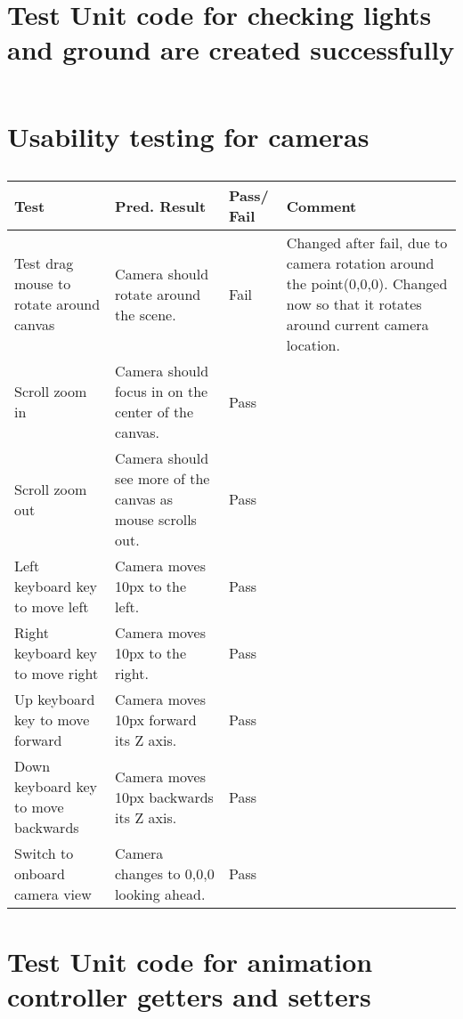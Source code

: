 \section{Test Unit code for checking lights and ground are created successfully}
\label{test:lights}
\begin{figure}[h!]
\caption{}
\begin{lstlisting}
\end{lstlisting}
\end{figure}

\section{Usability testing for cameras}
\begin{table}[h]
\begin{tabular}{|p{4.5cm}|p{4.5cm}|p{1cm}|p{4cm}|}
\hline
\textbf{Test} & \textbf{Pred. Result} & \textbf{Pass/ Fail} & \textbf{Comment}                        \\ \hline
Test drag mouse to rotate around canvas    &  Camera should rotate around the scene.  &     Fail       &  Changed after fail, due to camera rotation around the point(0,0,0). Changed now so that it rotates around current camera location.    \\ \hline
Scroll zoom in    &   Camera should focus in on the center of the canvas. &   Pass         &    \\ \hline
Scroll zoom out    &   Camera should see more of the canvas as mouse scrolls out. & Pass           &     \\ \hline
Left keyboard key to move left    &  Camera moves 10px to the left.  &   Pass         &     \\ \hline
Right keyboard key to move right    & Camera moves 10px to the right.   &    Pass        &     \\ \hline
Up keyboard key to move forward    &  Camera moves 10px forward its Z axis.  &   Pass         &     \\ \hline
Down keyboard key to move backwards    &  Camera moves 10px backwards its Z axis.  &  Pass          &     \\ \hline
Switch to onboard camera view   &  Camera changes to 0,0,0 looking ahead. &  Pass          &     \\ \hline
\end{tabular}
\label{test:cameras}
\caption{}
\end{table}

\section{Test Unit code for animation controller getters and setters}
\label{test:animation}
\begin{figure}[h!]
\caption{}
\begin{lstlisting}
\end{lstlisting}
\end{figure}

